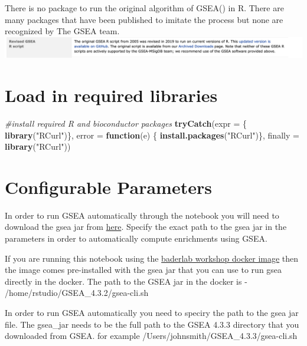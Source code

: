 \documentclass[
]{book}
\newenvironment{Shaded}{\begin{snugshade}}{\end{snugshade}}
\newcommand{\AttributeTok}[1]{\textcolor[rgb]{0.13,0.29,0.53}{#1}}
\newcommand{\CommentTok}[1]{\textcolor[rgb]{0.56,0.35,0.01}{\textit{#1}}}
\newcommand{\ControlFlowTok}[1]{\textcolor[rgb]{0.13,0.29,0.53}{\textbf{#1}}}
\newcommand{\FunctionTok}[1]{\textcolor[rgb]{0.13,0.29,0.53}{\textbf{#1}}}
\newcommand{\NormalTok}[1]{#1}
\newcommand{\StringTok}[1]{\textcolor[rgb]{0.31,0.60,0.02}{#1}}
\begin{document}
There is no package to run the original algorithm of GSEA() in R. There are many packages that have been published to imitate the process but none are recognized by The GSEA team.\\
\includegraphics{./images/gsea_r_package_message.png}

\section{Load in required libraries}\label{load-in-required-libraries}

\begin{Shaded}
\begin{Highlighting}[]
\CommentTok{\#install required R and bioconductor packages}
\FunctionTok{tryCatch}\NormalTok{(}\AttributeTok{expr =}\NormalTok{ \{ }\FunctionTok{library}\NormalTok{(}\StringTok{"RCurl"}\NormalTok{)\}, }
         \AttributeTok{error =} \ControlFlowTok{function}\NormalTok{(e) \{  }
           \FunctionTok{install.packages}\NormalTok{(}\StringTok{"RCurl"}\NormalTok{)\}, }
         \AttributeTok{finally =} \FunctionTok{library}\NormalTok{(}\StringTok{"RCurl"}\NormalTok{))}
\end{Highlighting}
\end{Shaded}

\section{Configurable Parameters}\label{configurable-parameters}

In order to run GSEA automatically through the notebook you will need to download the gsea jar from \href{http://software.broadinstitute.org/gsea/downloads.jsp}{here}. Specify the exact path to the gsea jar in the parameters in order to automatically compute enrichments using GSEA.

If you are running this notebook using the \href{https://hub.docker.com/r/risserlin/workshop_base_image}{baderlab workshop docker image} then the image comes pre-installed with the gsea jar that you can use to run gsea directly in the docker. The path to the GSEA jar in the docker is - /home/rstudio/GSEA\_4.3.2/gsea-cli.sh

In order to run GSEA automatically you need to speciry the path to the gsea jar file.
The gsea\_jar needs to be the full path to the GSEA 4.3.3 directory that you downloaded from GSEA. for example /Users/johnsmith/GSEA\_4.3.3/gsea-cli.sh
\end{document}

